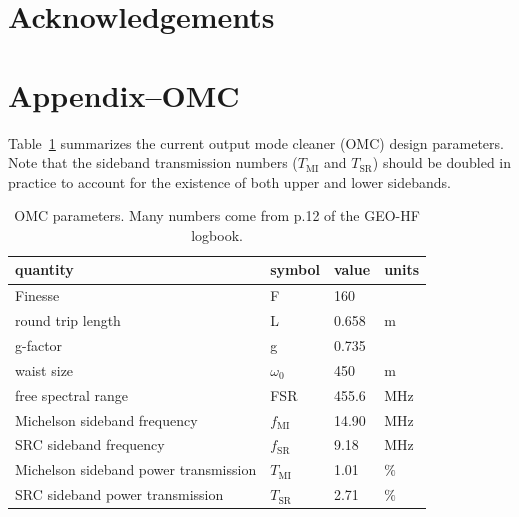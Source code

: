 \documentclass{ligodoc}
\newcommand{\micro}{\textmu{}}
\begin{document}
\section{Acknowledgements}



\section{Appendix--OMC}
Table~\ref{tab:OMCparams} summarizes the current output mode cleaner
(OMC) design parameters. Note that the sideband transmission numbers
($T_{\mathrm{MI}}$ and $T_{\mathrm{SR}}$) should be doubled in
practice to account for the existence of both upper and lower
sidebands.

\begin{table}
\centering
\caption{OMC parameters. Many numbers come from p.12 of the GEO-HF logbook.}
\begin{tabular}{l l l l} %
\hline
quantity & symbol & value & units \\
\hline
Finesse & F & 160 & \\
round trip length & L & 0.658 & m \\
g-factor & g & 0.735 & \\
waist size & $\omega_0$ & 450 & \micro m \\
free spectral range & FSR & 455.6 & MHz \\
Michelson sideband frequency & $f_{\mathrm{MI}}$ & 14.90 & MHz \\
SRC sideband frequency & $f_{\mathrm{SR}}$ & 9.18 & MHz \\
Michelson sideband power transmission & $T_{\mathrm{MI}}$ & 1.01 & $\%$ \\
SRC sideband power transmission & $T_{\mathrm{SR}}$ & 2.71 & $\%$ \\
\hline
\end{tabular}
\label{tab:OMCparams}
\end{table}
\end{document}
